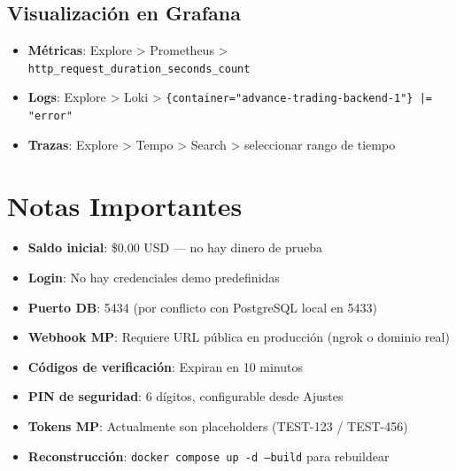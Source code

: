 \documentclass[12pt,oneside]{article}
\begin{document}
\subsection{Visualización en Grafana}

\begin{itemize}
    \item \textbf{Métricas}: Explore > Prometheus > \texttt{http\_request\_duration\_seconds\_count}
    \item \textbf{Logs}: Explore > Loki > \texttt{\{container="advance-trading-backend-1"\} |= "error"}
    \item \textbf{Trazas}: Explore > Tempo > Search > seleccionar rango de tiempo
\end{itemize}

\section{Notas Importantes}

\begin{itemize}
    \item \textbf{Saldo inicial}: \$0.00 USD — no hay dinero de prueba
    \item \textbf{Login}: No hay credenciales demo predefinidas
    \item \textbf{Puerto DB}: 5434 (por conflicto con PostgreSQL local en 5433)
    \item \textbf{Webhook MP}: Requiere URL pública en producción (ngrok o dominio real)
    \item \textbf{Códigos de verificación}: Expiran en 10 minutos
    \item \textbf{PIN de seguridad}: 6 dígitos, configurable desde Ajustes
    \item \textbf{Tokens MP}: Actualmente son placeholders (TEST-123 / TEST-456)
    \item \textbf{Reconstrucción}: \texttt{docker compose up -d --build} para rebuildear
\end{itemize}
\end{document}
